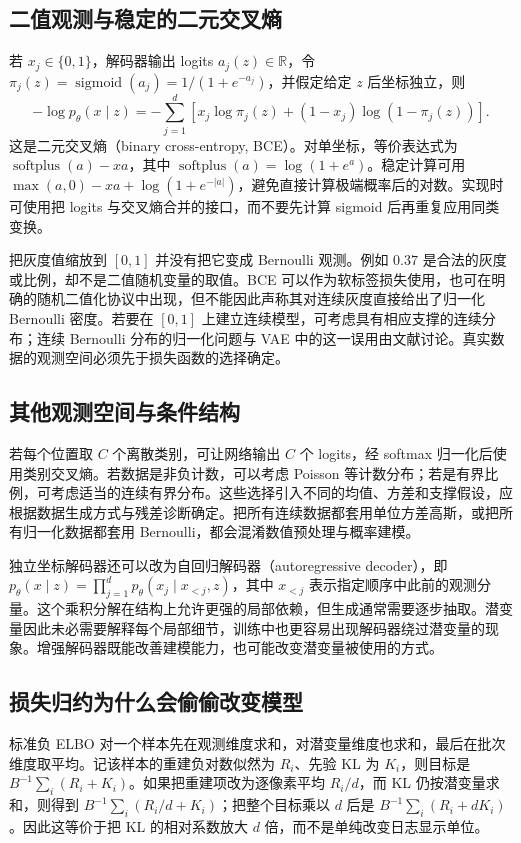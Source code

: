 \documentclass[UTF8,12pt,a4paper,fontset=fandol]{ctexart}
\begin{document}
\subsection{二值观测与稳定的二元交叉熵}
若 $x_j\in\{0,1\}$，解码器输出 logits $a_j(z)\in\mathbb R$，令 $\pi_j(z)=\operatorname{sigmoid}(a_j)=1/(1+e^{-a_j})$，并假定给定 $z$ 后坐标独立，则
\begin{equation}
 -\log p_\theta(x\mid z)
 =-\sum_{j=1}^{d}\left[x_j\log\pi_j(z)+(1-x_j)\log(1-\pi_j(z))\right].
 \label{eq:vae-bernoulli-nll}
\end{equation}
这是二元交叉熵（binary cross-entropy, BCE）。对单坐标，等价表达式为 $\operatorname{softplus}(a)-xa$，其中 $\operatorname{softplus}(a)=\log(1+e^a)$。稳定计算可用 $\max(a,0)-xa+\log(1+e^{-|a|})$，避免直接计算极端概率后的对数。实现时可使用把 logits 与交叉熵合并的接口，而不要先计算 sigmoid 后再重复应用同类变换。

把灰度值缩放到 $[0,1]$ 并没有把它变成 Bernoulli 观测。例如 $0.37$ 是合法的灰度或比例，却不是二值随机变量的取值。BCE 可以作为软标签损失使用，也可在明确的随机二值化协议中出现，但不能因此声称其对连续灰度直接给出了归一化 Bernoulli 密度。若要在 $[0,1]$ 上建立连续模型，可考虑具有相应支撑的连续分布；连续 Bernoulli 分布的归一化问题与 VAE 中的这一误用由文献\cite{loaiza2019}讨论。真实数据的观测空间必须先于损失函数的选择确定。

\subsection{其他观测空间与条件结构}
若每个位置取 $C$ 个离散类别，可让网络输出 $C$ 个 logits，经 softmax 归一化后使用类别交叉熵。若数据是非负计数，可以考虑 Poisson 等计数分布；若是有界比例，可考虑适当的连续有界分布。这些选择引入不同的均值、方差和支撑假设，应根据数据生成方式与残差诊断确定。把所有连续数据都套用单位方差高斯，或把所有归一化数据都套用 Bernoulli，都会混淆数值预处理与概率建模。

独立坐标解码器还可以改为自回归解码器（autoregressive decoder），即 $p_\theta(x\mid z)=\prod_{j=1}^{d}p_\theta(x_j\mid x_{<j},z)$，其中 $x_{<j}$ 表示指定顺序中此前的观测分量。这个乘积分解在结构上允许更强的局部依赖，但生成通常需要逐步抽取。潜变量因此未必需要解释每个局部细节，训练中也更容易出现解码器绕过潜变量的现象。增强解码器既能改善建模能力，也可能改变潜变量被使用的方式。

\subsection{损失归约为什么会偷偷改变模型}
标准负 ELBO 对一个样本先在观测维度求和，对潜变量维度也求和，最后在批次维度取平均。记该样本的重建负对数似然为 $R_i$、先验 KL 为 $K_i$，则目标是 $B^{-1}\sum_i(R_i+K_i)$。如果把重建项改为逐像素平均 $R_i/d$，而 KL 仍按潜变量求和，则得到 $B^{-1}\sum_i(R_i/d+K_i)$；把整个目标乘以 $d$ 后是 $B^{-1}\sum_i(R_i+dK_i)$。因此这等价于把 KL 的相对系数放大 $d$ 倍，而不是单纯改变日志显示单位。
\end{document}
